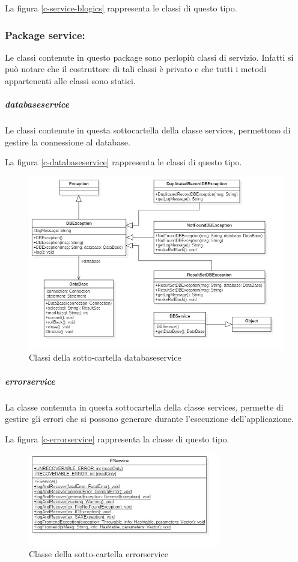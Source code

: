 	La figura \vref{c-service-blogics} rappresenta le classi di questo tipo.
	
	\subsubsection*{Package service:}
	Le classi contenute in questo package sono perlopiù classi di servizio. Infatti si può notare che il costruttore di tali classi è privato e che tutti i metodi appartenenti alle classi sono statici.
	
	\subparagraph{databaseservice}
	Le classi contenute in questa sottocartella della classe services, permettono di gestire la connessione al database.
	
	La figura \vref{c-databaseservice} rappresenta le classi di questo tipo.
	
	\begin{figure}[h]
		\centering
		\includegraphics[width=1\textwidth]
		{immagini/c-databaseservice}
		
		\caption{Classi della sotto-cartella databaseservice}
		\label{c-databaseservice}
	\end{figure}
	
	\subparagraph{errorservice}
	La classe contenuta in questa sottocartella della classe services, permette di gestire gli errori che si possono generare durante l'esecuzione dell'applicazione.
	
	La figura \vref{c-errorservice} rappresenta la classe di questo tipo.
	
	\begin{figure}[h]
		\centering
		\includegraphics[width=0.75\textwidth]
		{immagini/c-errorservice}
		
		\caption{Classe della sotto-cartella errorservice}
		\label{c-errorservice}
	\end{figure}
	
